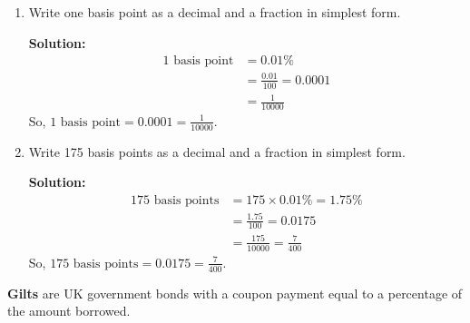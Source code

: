 \documentclass[12pt]{article}
\begin{document}
\begin{enumerate}[label=(\alph*)]
    \item Write one basis point as a decimal and a fraction in simplest form.
    
    \textbf{Solution:}
    \begin{align*}
        1 \text{ basis point} &= 0.01\% \\
        &= \frac{0.01}{100} = 0.0001 \\
        &= \frac{1}{10000}
    \end{align*}
    So, \(1 \text{ basis point} = 0.0001 = \frac{1}{10000}\).

    \item Write 175 basis points as a decimal and a fraction in simplest form.
    
    \textbf{Solution:}
    \begin{align*}
        175 \text{ basis points} &= 175 \times 0.01\% = 1.75\% \\
        &= \frac{1.75}{100} = 0.0175 \\
        &= \frac{175}{10000} = \frac{7}{400}
    \end{align*}
    So, \(175 \text{ basis points} = 0.0175 = \frac{7}{400}\).
\end{enumerate}

\textbf{Gilts} are UK government bonds with a coupon payment equal to a percentage of the amount borrowed.
\end{document}
